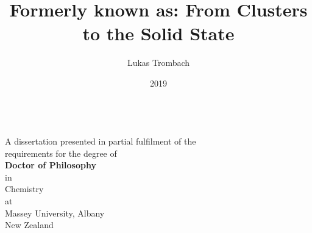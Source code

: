 
\author{Lukas Trombach}
\title{Formerly known as: From Clusters to the Solid State}
\date{2019}

\makeatletter
\begin{titlepage}
\begin{center}
\vspace*{10mm}
    \LARGE{\textbf{\@title
    }}\\\vspace{2cm}
    \large{
    A dissertation presented in partial fulfilment of the \\ requirements for the degree of 
    }\\\vspace{2cm}
    \large{\textbf{
    Doctor of Philosophy
    }}\\
	\large{in \\ Chemistry}\\\vspace{2cm}
    \large{at \\ Massey University, Albany \\ New Zealand}\\\vspace{2cm}
    \large{\textbf{\@author}}\\\vspace{1.5cm}
    \large{\@date}
    
\end{center}
\end{titlepage}

